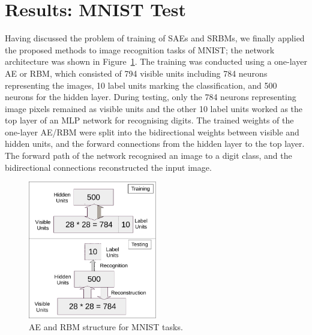 

\section{Results: MNIST Test}
Having discussed the problem of training of SAEs and SRBMs, we finally applied the proposed methods to image recognition tasks of MNIST;
the network architecture was shown in Figure~\ref{fig:MNSIT}.
The training was conducted using a one-layer AE or RBM, which consisted of 794 visible units including 784 neurons representing the images, 10 label units marking the classification, and 500 neurons for the hidden layer.
During testing, only the 784 neurons representing image pixels remained as visible units and the other 10 label units worked as the top layer of an MLP network for recognising digits.
The trained weights of the one-layer AE/RBM were split into the bidirectional weights between visible and hidden units, and the forward connections from the hidden layer to the top layer.
The forward path of the network recognised an image to a digit class, and the bidirectional connections reconstructed the input image.

\begin{figure}
	\centering
	\includegraphics[width=0.5\textwidth]{pics_sdlm/mnist.pdf}
	\caption{AE and RBM structure for MNIST tasks.}
	\label{fig:MNSIT}
\end{figure}

